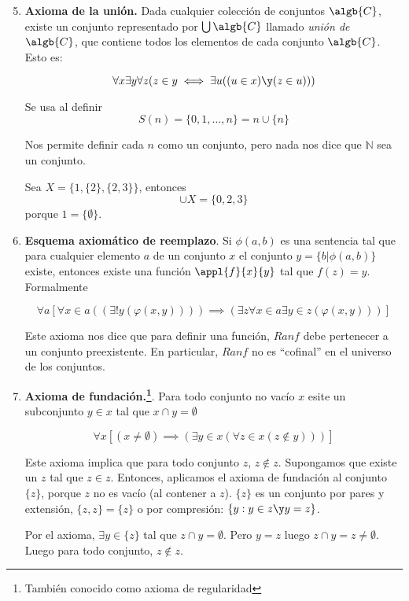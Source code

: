 	\begin{enumerate}
	\setcounter{enumi}{4}
		\item \textbf{Axioma de la unión.} Dada cualquier colección de conjuntos $\algb{C}$, existe un conjunto representado por $\bigcup \algb{C}$ llamado \textit{unión de }$\algb{C}$, que contiene todos los elementos de cada conjunto $\algb{C}$. Esto es:
		 
		 $$\forall x \exists y \forall z (z\in y\iff\exists u((u\in x)\y (z\in u)))$$
		 
		 Se usa al definir $$S(n) = \{0, 1,\hdots,n\} = n\cup \{n\}$$
		 
		 Nos permite definir cada $n$ como un conjunto, pero nada nos dice que $\mathbb{N}$ sea un conjunto.		 
		 \begin{example}
			Sea $X=\{1,\{2\},\{2,3\}\}$, entonces
			$$\cup X = \{0, 2, 3\}$$ porque $1=\{\emptyset\}$.
		 \end{example}
		 
		 \item \textbf{Esquema axiomático de reemplazo}. Si $\phi(a,b)$ es una sentencia tal que para cualquier elemento $a$ de un conjunto $x$ el conjunto $y=\{b | \phi(a,b)\}$ existe, entonces existe una función $\appl{f}{x}{y}$ tal que $f(z)=y$. Formalmente

		 $$\forall a \left[\forall x\in a ((\exists! y (\varphi(x,y))))\implies (\exists z \forall x \in a \exists y \in z (\varphi(x,y)))\right]$$
		 
		 Este axioma nos dice que para definir una función, $Ran f$ debe pertenecer a un conjunto preexistente. En particular, $Ranf$ no es ``cofinal'' en el universo de los conjuntos.
		 
		 \item \textbf{Axioma de fundación.\footnote{También conocido como axioma de regularidad}}. Para todo conjunto no vacío $x$ esite un subconjunto $y \in x$ tal que $x \cap y = \emptyset$

		 $$\forall x \left[(x\neq \emptyset)\implies (\exists y \in x (\forall z \in x (z\notin y)))\right]$$
		 
		 Este axioma implica que para todo conjunto $z$, $z\notin z$. Supongamos que existe un $z$ tal que $z\in z$. Entonces, aplicamos el axioma de fundación al conjunto $\{z\}$, porque $z$ no es vacío (al contener a $z$).  $\{z\}$ es un conjunto por pares y extensión, $\{z,z\} = \{z\}$ o por compresión: $\{y : y\in z \y  y=z\}$.
		 
		 Por el axioma, $\exists y\in\{z\}$ tal que $z\cap y=\emptyset$. Pero $y=z$ luego $z\cap y = z \neq \emptyset$. Luego para todo conjunto, $z\notin z$.
		 

\end{enumerate}
